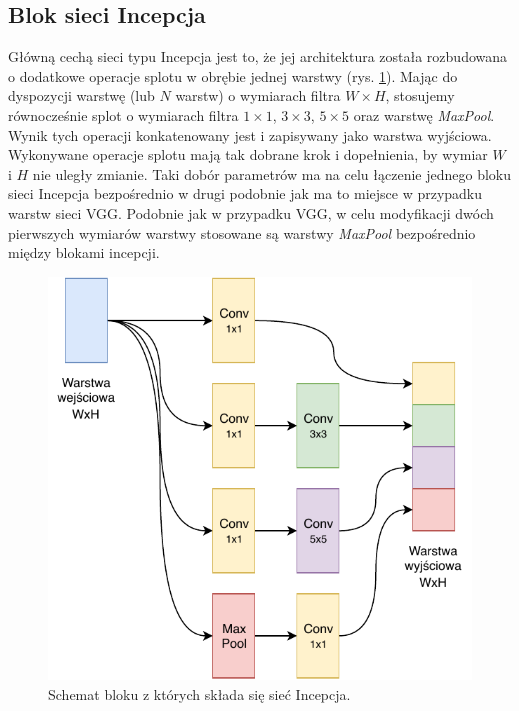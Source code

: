\subsection{Blok sieci Incepcja}
\label{subsection:inception-block}
Główną cechą sieci typu Incepcja jest to, że jej architektura została rozbudowana o dodatkowe operacje splotu w obrębie jednej warstwy (rys. \ref{fig:inception-block}).
Mając do dyspozycji warstwę (lub \(N\) warstw) o wymiarach filtra \(W \times H\), stosujemy równocześnie splot o wymiarach filtra \(1 \times 1\), \(3 \times 3\), \(5 \times 5\) oraz warstwę \textit{MaxPool}. 
Wynik tych operacji konkatenowany jest i zapisywany jako warstwa wyjściowa. Wykonywane operacje splotu mają tak dobrane krok i dopełnienia, by wymiar \(W\) i \(H\) nie uległy zmianie. 
Taki dobór parametrów ma na celu łączenie jednego bloku sieci Incepcja bezpośrednio w drugi podobnie jak ma to miejsce w przypadku warstw sieci VGG. 
Podobnie jak w przypadku VGG, w celu modyfikacji dwóch pierwszych wymiarów warstwy stosowane są warstwy \textit{MaxPool} bezpośrednio między blokami incepcji.

\begin{figure}[ht]
\centerline{\includegraphics[scale=1]{resources/Inception_block.pdf}}
\caption{Schemat bloku z których składa się sieć Incepcja.}
\label{fig:inception-block}
\end{figure}

